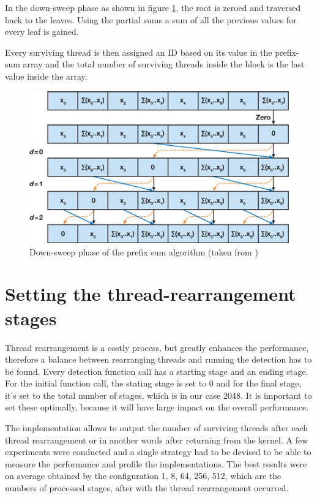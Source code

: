 In the down-sweep phase as shown in figure \ref{fig:sweepdown}, the root is zeroed and traversed back to the leaves. Using the partial sums a sum of all the previous values for every leaf is gained.

Every surviving thread is then assigned an ID based on its value in the prefix-sum array and the total number of surviving threads inside the block is the last value inside the array.

\begin{center}
\begin{figure}[ht]
	\centering\includegraphics[width=0.6\linewidth]{fig/sweepdown.jpg}
	\caption{Down-sweep phase of the prefix sum algorithm (taken from \cite{harris2007parallel})}
	\label{fig:sweepdown}
\end{figure}
\end{center}

\section{Setting the thread-rearrangement stages}

Thread rearrangement is a costly process, but greatly enhances the performance, therefore a balance between rearranging threads and running the detection has to be found. Every detection function call has a starting stage and an ending stage. For the initial function call, the stating stage is set to 0 and for the final stage, it's set to the total number of stages, which is in our case 2048. It is important to set these optimally, because it will have large impact on the overall performance.

The implementation allows to output the number of surviving threads after each thread rearrangement or in another words after returning from the kernel. A few experiments were conducted and a single strategy had to be devised to be able to measure the performance and profile the implementations. The best results were on average obtained by the configuration 1, 8, 64, 256, 512, which are the numbers of processed stages, after with the thread rearrangement occurred.

